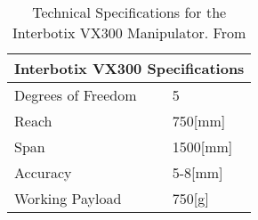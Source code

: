 \begin{table}[H]
\centering
\caption{Technical Specifications for the Interbotix VX300 Manipulator. From \cite{interbotix_vx300}}
\label{tab:M:CD:FC:VX300Specs}
\vspace{1mm}
\begin{tabular}{ll}
\hline
\multicolumn{2}{c}{\textbf{Interbotix VX300 Specifications}} \\ \hline
Degrees of Freedom               & 5                         \\
Reach                            & 750{[}mm{]}               \\
Span                             & 1500{[}mm{]}              \\
Accuracy                         & 5-8{[}mm{]}               \\
Working Payload                  & 750{[}g{]}                \\ \hline
\end{tabular}
\end{table}